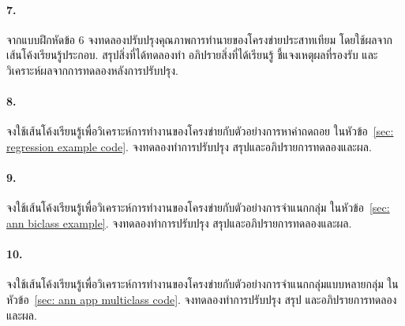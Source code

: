 \paragraph{7.} จากแบบฝึกหัดข้อ 6 จงทดลองปรับปรุงคุณภาพการทำนายของโครงข่ายประสาทเทียม โดยใช้ผลจากเส้นโค้งเรียนรู้ประกอบ. 
สรุปสิ่งที่ได้ทดลองทำ อภิปรายสิ่งที่ได้เรียนรู้ ชี้แจงเหตุผลที่รองรับ และวิเคราะห์ผลจากการทดลองหลังการปรับปรุง.

\paragraph{8.} จงใช้เส้นโค้งเรียนรู้เพื่อวิเคราะห์การทำงานของโครงข่ายกับตัวอย่างการหาค่าถดถอย ในหัวข้อ~\ref{sec: regression example code}.
จงทดลองทำการปรับปรุง สรุปและอภิปรายการทดลองและผล.

\paragraph{9.} จงใช้เส้นโค้งเรียนรู้เพื่อวิเคราะห์การทำงานของโครงข่ายกับตัวอย่างการจำแนกกลุ่ม ในหัวข้อ~\ref{sec: ann biclass example}.
จงทดลองทำการปรับปรุง สรุปและอภิปรายการทดลองและผล.

\paragraph{10.} จงใช้เส้นโค้งเรียนรู้เพื่อวิเคราะห์การทำงานของโครงข่ายกับตัวอย่างการจำแนกกลุ่มแบบหลายกลุ่ม ในหัวข้อ~\ref{sec: ann app multiclass code}.
จงทดลองทำการปรับปรุง สรุป และอภิปรายการทดลองและผล.